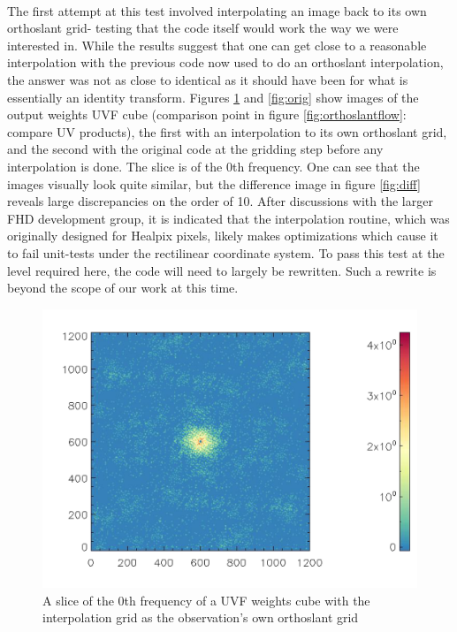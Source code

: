 \documentclass[linenumbers]{aastex631}
\begin{document}
\\
The first attempt at this test involved interpolating an image back to its own orthoslant grid- testing that the code itself would work the way we were interested in. While the results suggest that one can get close to a reasonable interpolation with the previous code now used to do an orthoslant interpolation, the answer was not as close to identical as it should have been for what is essentially an identity transform.
\newline
Figures \ref{fig:mine} and \ref{fig:orig} show images of the output weights UVF cube (comparison point in figure \ref{fig:orthoslantflow}: compare UV products), the first with an interpolation to its own orthoslant grid, and the second with the original code at the gridding step before any interpolation is done. The slice is of the 0th frequency.  One can see that the images visually look quite similar, but the difference image in figure \ref{fig:diff} reveals large discrepancies on the order of 10\percent. After discussions with the larger FHD development group, it is indicated that the interpolation routine, which was originally designed for Healpix pixels, likely makes optimizations which cause it to fail unit-tests under the rectilinear coordinate system. To pass this test at the level required here, the code will need to largely be rewritten. Such a rewrite is beyond the scope of our work at this time. 

\begin{figure}[h!]
    \centering
    \includegraphics[scale=.2]{master run}
    \caption{A slice of the 0th frequency of a UVF weights cube with the interpolation grid as the observation's own orthoslant grid}
    \label{fig:mine}
\end{figure}
\end{document}
